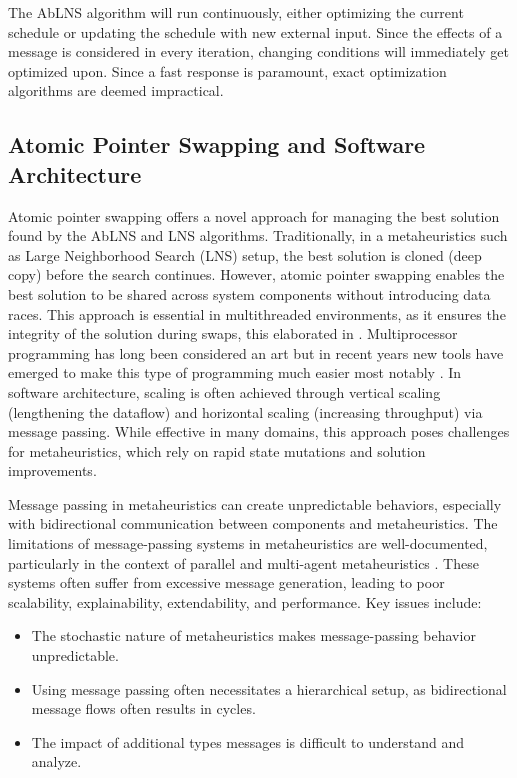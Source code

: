 The AbLNS algorithm will run continuously, either optimizing the current
schedule or updating the schedule with new external input. Since the
effects of a message is considered in every iteration, changing conditions
will immediately get optimized upon. Since a fast response is paramount, exact
optimization algorithms are deemed impractical.

\subsection{Atomic Pointer Swapping and Software Architecture}
Atomic pointer swapping offers a novel approach for managing the best
solution found by the AbLNS and LNS algorithms.
Traditionally, in a metaheuristics such as Large Neighborhood Search (LNS)
setup, the best solution is cloned (deep copy) before the search continues. However, atomic
pointer swapping enables the best solution to be shared across system components
without introducing data races. This approach is essential in multithreaded
environments, as it ensures the integrity of the solution during swaps, this elaborated in 
\citep{herlihy2020art}. Multiprocessor programming has long been considered an art but 
in recent years new tools have emerged to make this type of programming much 
easier most notably \citep{noauthor_rust_nodate}. In
software architecture, scaling is often achieved through vertical scaling
(lengthening the dataflow) and horizontal scaling (increasing throughput)
via message passing. While effective in many domains, this approach poses
challenges for metaheuristics, which rely on rapid state mutations and solution
improvements.

Message passing in metaheuristics can create unpredictable behaviors, especially
with bidirectional communication between components and metaheuristics. The
limitations of message-passing systems in metaheuristics are well-documented,
particularly in the context of parallel and multi-agent metaheuristics
\citep{talbiMetaheuristicsDesignImplementation2009parallelchapter}. These systems often suffer
from excessive message generation, leading to poor scalability, explainability,
extendability, and performance. Key issues include:

\begin{itemize} 
	\item The stochastic nature
		of metaheuristics makes message-passing behavior unpredictable. 
	\item Using message passing often necessitates a
		hierarchical setup, as bidirectional message flows often results in cycles. 
	\item The
		impact of additional types messages is difficult to understand and analyze. 
\end{itemize}

